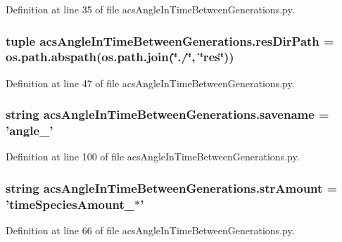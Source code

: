 Definition at line 35 of file acs\-Angle\-In\-Time\-Between\-Generations.\-py.

\hypertarget{a00090_a3912324aec0b455c560ebd6e192e44aa}{
\subsubsection[{res\-Dir\-Path}]{\setlength{\rightskip}{0pt plus 5cm}tuple acs\-Angle\-In\-Time\-Between\-Generations.\-res\-Dir\-Path = os.\-path.\-abspath(os.\-path.\-join(\char`\"{}./\char`\"{}, \char`\"{}res\char`\"{}))}}\label{a00090_a3912324aec0b455c560ebd6e192e44aa}


Definition at line 47 of file acs\-Angle\-In\-Time\-Between\-Generations.\-py.

\hypertarget{a00090_a8c361074d6e19ebcfb4f61f18cb8be4c}{
\subsubsection[{savename}]{\setlength{\rightskip}{0pt plus 5cm}string acs\-Angle\-In\-Time\-Between\-Generations.\-savename = 'angle\-\_\-'}}\label{a00090_a8c361074d6e19ebcfb4f61f18cb8be4c}


Definition at line 100 of file acs\-Angle\-In\-Time\-Between\-Generations.\-py.

\hypertarget{a00090_ab01731bd9870c6012778591010032301}{
\subsubsection[{str\-Amount}]{\setlength{\rightskip}{0pt plus 5cm}string acs\-Angle\-In\-Time\-Between\-Generations.\-str\-Amount = 'time\-Species\-Amount\-\_\-$\ast$'}}\label{a00090_ab01731bd9870c6012778591010032301}


Definition at line 66 of file acs\-Angle\-In\-Time\-Between\-Generations.\-py.

